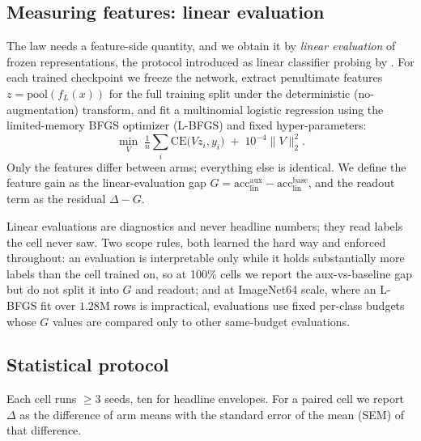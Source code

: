 \subsection{Measuring features: linear evaluation}\label{sec:probe}
The law needs a feature-side quantity, and we obtain it by \emph{linear
evaluation} of frozen representations, the protocol introduced as linear
classifier probing by \citet{alain2016understanding}. For each trained
checkpoint we freeze the network, extract penultimate features
$z = \mathrm{pool}(f_L(x))$ for the full training split under the
deterministic (no-augmentation) transform, and fit a multinomial logistic
regression using the limited-memory BFGS optimizer (L-BFGS) and fixed
hyper-parameters:
\begin{equation}
  \min_{V}\; \tfrac{1}{n}\!\sum_{i} \mathrm{CE}\bigl(Vz_i, y_i\bigr)
    \;+\; 10^{-4}\lVert V\rVert_2^2.
  \label{eq:probe}
\end{equation}
Only the features differ between arms; everything else is identical. We
define the feature gain as the linear-evaluation gap
$G = \mathrm{acc}_{\mathrm{lin}}^{\mathrm{aux}} -
     \mathrm{acc}_{\mathrm{lin}}^{\mathrm{base}}$, and the readout term
as the residual $\Delta - G$.

Linear evaluations are diagnostics and never headline numbers; they read
labels the cell never saw. Two scope rules, both learned the hard way and
enforced throughout: an evaluation is interpretable only while it holds
substantially more labels than the cell trained on, so at 100\% cells we
report the aux-vs-baseline gap but do not split it into $G$ and readout;
and at ImageNet64 scale, where an L-BFGS fit over $1.28$M rows is
impractical, evaluations use fixed per-class budgets whose $G$ values are
compared only to other same-budget evaluations.

\subsection{Statistical protocol}\label{sec:stats}
Each cell runs ${\geq}3$ seeds, ten for headline envelopes. For a paired
cell we report $\Delta$ as the difference of arm means with the standard
error of the mean (SEM) of that difference.

